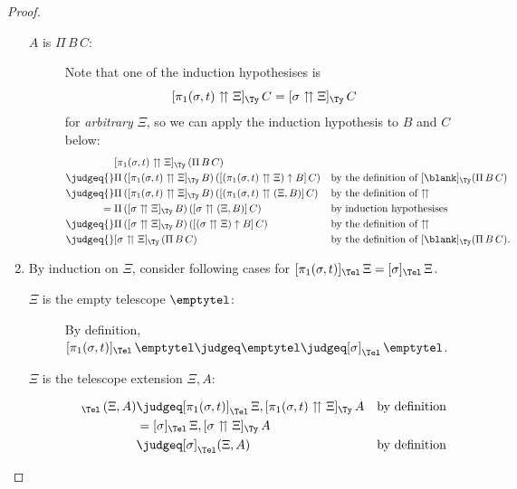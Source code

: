 \documentclass[a4paper,UKenglish,numberwithinsect,cleveref,thm-restate]{lipics-v2021}
\begin{document}
\begin{proof}
\begin{enumerate}
\begin{description}
        \item[$A$ is $\Pi\,B\,C$:]
          Note that one of the induction hypothesises is
          \[
            [\pi_1(\sigma, t) \upuparrows \Xi]_{\Ty}\,C = [\sigma \upuparrows \Xi]_{\Ty}\,C
          \]
          for \emph{arbitrary} $\Xi$, so we can apply the induction hypothesis to $B$ and $C$ below:
          \begin{align*}
            & [\pi_1(\sigma, t) \upuparrows \Xi]_{\Ty}\,(\Pi\,B\,C) \\
            \judgeq{} & \Pi\,([\pi_1(\sigma, t) \upuparrows \Xi]_{\Ty}\,B)\,([(\pi_1(\sigma, t) \upuparrows \Xi) \uparrow B]\,C) && \text{by the definition of $[\blank]_{\Ty}(\Pi\,B\,C)$} \\
            \judgeq{} & \Pi\,([\pi_1(\sigma, t) \upuparrows \Xi]_{\Ty}\,B)\,([(\pi_1(\sigma, t) \upuparrows (\Xi, B)]\,C) && \text{by the definition of $\upuparrows$} \\
            ={}       & \Pi\,([\sigma \upuparrows \Xi]_{\Ty}\,B)\,([\sigma \upuparrows (\Xi, B)]\,C) && \text{by induction hypothesises} \\
            \judgeq{} & \Pi\,([\sigma \upuparrows \Xi]_{\Ty}\,B)\,([(\sigma \upuparrows \Xi) \uparrow B]\,C) && \text{by the definition of $\upuparrows$} \\
            \judgeq{} & [\sigma\upuparrows \Xi]_{\Ty}\,(\Pi\,B\,C) && \text{by the definition of $[\blank]_{\Ty}(\Pi\,B\,C)$.}
          \end{align*}
      \end{description}
    \item By induction on $\Xi$, consider following cases for $[\pi_1(\sigma, t)]_{\Tel}\,\Xi = [\sigma]_{\Tel}\,\Xi$. 
      \begin{description}
        \item[$\Xi$ is the empty telescope $\emptytel$:] By definition, $[\pi_1(\sigma, t)]_{\Tel}\,\emptytel \judgeq \emptytel \judgeq [\sigma]_{\Tel}\,\emptytel$.
        \item[$\Xi$ is the telescope extension $\Xi, A$:] 
          \begin{align*}
            [\pi_1(\sigma, t)]_{\Tel}\,(\Xi, A) & \judgeq [\pi_1(\sigma, t)]_{\Tel}\,\Xi, [\pi_1(\sigma, t) \upuparrows \Xi]_{\Ty}\,A && \text{by definition} \\
                                                & = [\sigma]_{\Tel}\,\Xi, [\sigma \upuparrows \Xi]_{\Ty}\,A \\
                                                & \judgeq [\sigma]_{\Tel}(\Xi, A) && \text{by definition}

\end{align*}
\end{description}
\end{enumerate}
\end{proof}
\end{document}

